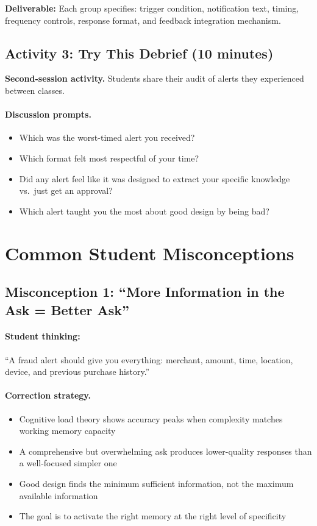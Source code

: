 \textbf{Deliverable:} Each group specifies: trigger condition, notification text, timing, frequency controls, response format, and feedback integration mechanism.

\subsection{Activity 3: Try This Debrief (10 minutes)}

\textbf{Second-session activity.} Students share their audit of alerts they experienced between classes.

\paragraph{Discussion prompts.}
\begin{itemize}
    \item Which was the worst-timed alert you received?
    \item Which format felt most respectful of your time?
    \item Did any alert feel like it was designed to extract your specific knowledge vs.\ just get an approval?
    \item Which alert taught you the most about good design by being bad?
\end{itemize}

\section{Common Student Misconceptions}

\subsection{Misconception 1: ``More Information in the Ask = Better Ask''}

\paragraph{Student thinking:} ``A fraud alert should give you everything: merchant, amount, time, location, device, and previous purchase history.''

\paragraph{Correction strategy.}
\begin{itemize}
    \item Cognitive load theory shows accuracy peaks when complexity matches working memory capacity
    \item A comprehensive but overwhelming ask produces lower-quality responses than a well-focused simpler one
    \item Good design finds the minimum sufficient information, not the maximum available information
    \item The goal is to activate the right memory at the right level of specificity
\end{itemize}

